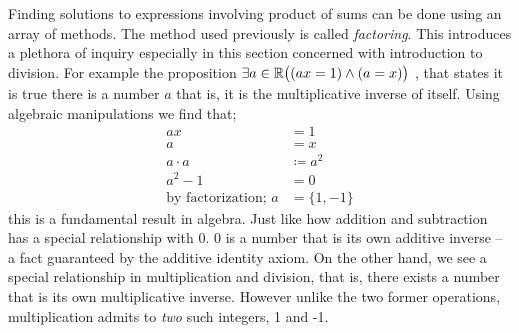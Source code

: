 \documentclass{article}
\newcommand{\paren}[1]{\mathopen{}\left( {#1}_{{}_{}}\,\negthickspace\right)\mathclose{}} %
\begin{document}
Finding solutions to expressions involving product of sums can be done using an array of methods. The method
used previously is called \emph{factoring}. This introduces a plethora of inquiry especially in this section
concerned with introduction to division. For example the proposition \(\exists a \in \mathbb{R} \paren{(ax = 1) \land (a = x)}\)
, that states it is true there is a number \(a\) that is, it is the multiplicative inverse of itself. Using algebraic 
manipulations we find that;
\begin{align*}
    ax &= 1 \\
    a &= x \\
    a \cdot a &\coloneqq a^2 \\
    a^2 - 1 &= 0 \\ 
    \text{by factorization; } a &= \{1, -1\} 
\end{align*}
this is a fundamental result in algebra. Just like how addition and subtraction has a special relationship
with 0. 0 is a number that is its own additive inverse -- a fact guaranteed by the additive identity axiom. 
On the other hand, we see a special relationship in multiplication and division, that is,
there exists a number that is its own multiplicative inverse. However unlike the two former operations,
multiplication admits to \emph{two} such integers, 1 and -1.  
\end{document}
